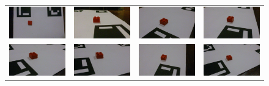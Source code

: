 \begin{figure}
\begin{tabular}{cccc}
  \includegraphics[width=0.25\linewidth]{img/classTestImg/01_top} &   \includegraphics[width=0.25\linewidth]{img/classTestImg/02_side} & \includegraphics[width=0.25\linewidth]{img/classTestImg/03_persp} &
\includegraphics[width=0.25\linewidth]{img/classTestImg/04_rand} \\
  \includegraphics[width=0.25\linewidth]{img/classTestImg/05_rand} &   \includegraphics[width=0.25\linewidth]{img/classTestImg/06_rand} & \includegraphics[width=0.25\linewidth]{img/classTestImg/07_rand} &
\includegraphics[width=0.25\linewidth]{img/classTestImg/08_rand} \\

\end{tabular}
\end{figure}
